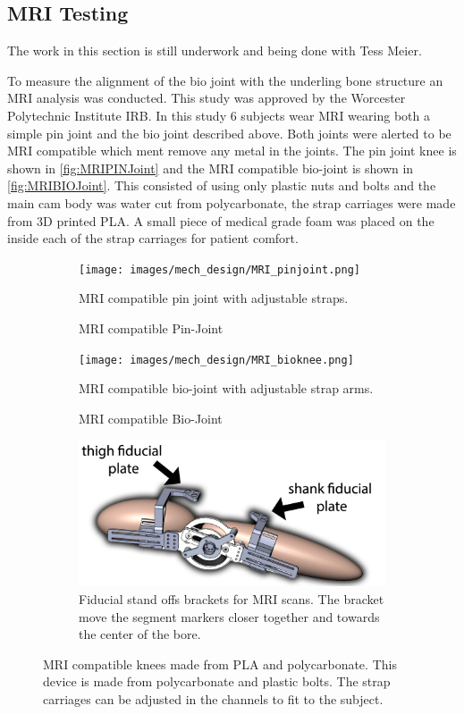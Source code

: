 \subsection{MRI Testing}

The work in this section is still underwork and being done with Tess Meier. 


To measure the alignment of the bio joint with the underling bone structure an MRI analysis was conducted. This study was approved by  the Worcester Polytechnic Institute IRB. In this study 6 subjects wear MRI wearing both a simple pin joint and the bio joint described above. Both joints were alerted to be MRI compatible which ment remove any metal in the joints.  The pin joint knee is shown in \autoref{fig:MRIPINJoint} and the MRI compatible bio-joint is shown in \autoref{fig:MRIBIOJoint}. This consisted of using only plastic nuts and bolts and the main cam body was water cut from polycarbonate, the strap carriages were made from 3D printed PLA. A small piece of medical grade foam was placed on the inside each of the strap carriages for patient comfort.    


\begin{figure}
    \begin{subfigure}{\textwidth}
        \centering
        \captionsetup{justification=centering}
        \texttt{[image: images/mech\_design/MRI\_pinjoint.png]}
        \caption{MRI compatible Pin-Joint}{MRI compatible pin joint with adjustable straps.  }
        \label{fig:MRIPINJoint}
    \end{subfigure}
    \begin{subfigure}{\textwidth}
        \centering
        \texttt{[image: images/mech\_design/MRI\_bioknee.png]}
          \captionsetup{justification=centering}
        \caption{MRI compatible Bio-Joint}{MRI compatible bio-joint with adjustable strap arms.}
        \label{fig:MRIBIOJoint}
    \end{subfigure}    
            \begin{subfigure}{\textwidth}
        \centering
        \includegraphics[width=0.75\linewidth]{images/mech_design/mri_knee_with_markers_edit.png}
          \captionsetup{justification=centering}
        \caption[fiducial stand off]{Fiducial stand offs brackets for MRI scans. The bracket move the segment markers closer together and towards the center of the bore.}
        \label{fig:MRIMarkerStandoff}
    \end{subfigure}
    \caption[MRI Compatible Knees]{MRI compatible knees made from PLA and polycarbonate. This device is made from polycarbonate and plastic bolts. The strap carriages can be adjusted in the channels to fit to the subject.}
    \label{fig:MRIKnees}
\end{figure}



